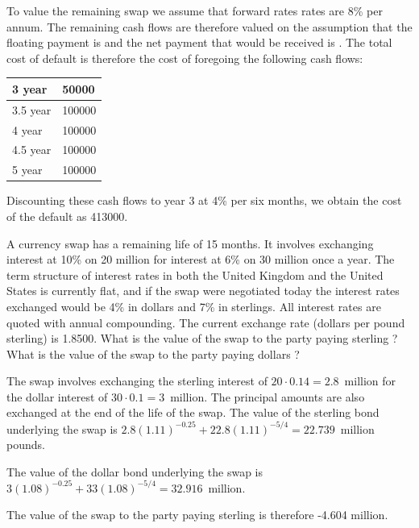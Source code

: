 \documentclass[12pt,a4paper]{exam}
\begin{document}
\begin{questions}
\begin{solution}
\begin{solution}
To value the remaining swap we assume that forward rates 
rates are 8\% per annum. The remaining cash flows are therefore valued on the assumption that the floating payment is and the net payment that would be received is . The
total cost of default is therefore the cost of foregoing the following cash flows:
\begin{center}
	\begin{tabular}{|l|l|}
	3 year & 50000 \\ \hline
	3.5 year & 100000 \\ \hline
	4 year &  100000 \\ \hline
	4.5 year & 100000 \\ \hline
	5 year & 100000 \\ \hline
	\end{tabular}
\end{center}
Discounting these cash flows to year 3 at 4\% per six months, we obtain the cost of the default as 413000.
\end{solution}

\question A currency swap has a remaining life of 15 months. It involves exchanging interest at 10\% on 20 million for interest at 6\% on 30 million once a year. The term structure of interest rates in both the United Kingdom and the United States is currently flat,
and if the swap were negotiated today the interest rates exchanged would be 4\% in dollars and 7\% in sterlings. All interest rates are quoted with annual compounding. The current exchange rate (dollars per pound sterling) is 1.8500. What is the value of the swap to the party paying sterling ? What is the value of the swap to the party paying dollars ?

\begin{solution}
The swap involves exchanging the sterling interest of $20\cdot 0.14 = 2.8$~million for the dollar interest of $30\cdot 0.1 = 3$~million. 
The principal amounts are also exchanged at the end of the life of the swap. The value of the sterling bond underlying the swap is
$2.8(1.11)^{-0.25} + 22.8(1.11)^{-5/4} = 22.739$~million pounds.

The value of the dollar bond underlying the swap is $3(1.08)^{-0.25} + 33(1.08)^{-5/4} = 32.916$~million.

The value of the swap to the party paying sterling is therefore
-4.604 million.


\end{solution}
\end{solution}
\end{questions}
\end{document}
